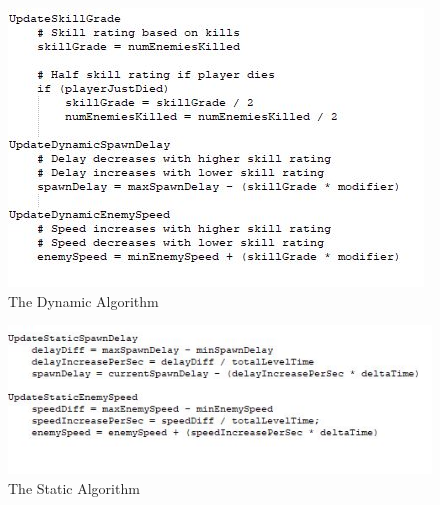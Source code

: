 \documentclass[journal]{IEEEtran}
\begin{document}
\begin{figure}[h]
	\includegraphics[width=1.5\linewidth]{pseudocodedynamic.jpg}
	\caption{The Dynamic Algorithm}
	\label{fig::23}
\end{figure} 

\begin{figure}[h]
	\includegraphics[width=2.0\linewidth]{pseudocodestatic.jpg}
	\caption{The Static Algorithm}
	\label{fig::24}
\end{figure} 
\end{document}
